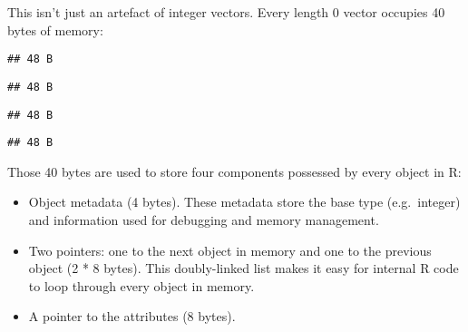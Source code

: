 This isn't just an artefact of integer vectors. Every length 0 vector
occupies 40 bytes of memory:

\begin{Shaded}
\begin{Highlighting}[]
\NormalTok{(}\NormalTok{())}
\end{Highlighting}
\end{Shaded}

\begin{verbatim}
## 48 B
\end{verbatim}

\begin{Shaded}
\begin{Highlighting}[]
\NormalTok{(}\NormalTok{())}
\end{Highlighting}
\end{Shaded}

\begin{verbatim}
## 48 B
\end{verbatim}

\begin{Shaded}
\begin{Highlighting}[]
\NormalTok{(}\NormalTok{())}
\end{Highlighting}
\end{Shaded}

\begin{verbatim}
## 48 B
\end{verbatim}

\begin{Shaded}
\begin{Highlighting}[]
\NormalTok{(}\NormalTok{())}
\end{Highlighting}
\end{Shaded}

\begin{verbatim}
## 48 B
\end{verbatim}

Those 40 bytes are used to store four components possessed by every
object in R:

\begin{itemize}
\item
  Object metadata (4 bytes). These metadata store the base type
  (e.g.~integer) and information used for debugging and memory
  management.
\item
  Two pointers: one to the next object in memory and one to the previous
  object (2 * 8 bytes). This doubly-linked list makes it easy for
  internal R code to loop through every object in memory.
\item
  A pointer to the attributes (8 bytes).
\end{itemize}

